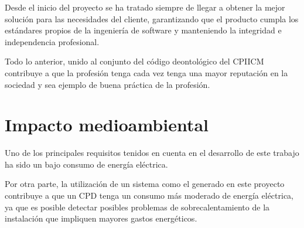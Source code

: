 Desde el inicio del proyecto se ha tratado siempre de llegar a obtener la mejor solución para las necesidades del cliente, garantizando que el producto cumpla los estándares propios de la ingeniería de software y manteniendo la integridad e independencia profesional.

Todo lo anterior, unido al conjunto del código deontológico del CPIICM~\cite{cpiicm_codigo_2012} contribuye a que la profesión tenga cada vez tenga una mayor reputación en la sociedad y sea ejemplo de buena práctica de la profesión.

\section{Impacto medioambiental}\label{sec:impacto-medioambiental}
Uno de los principales requisitos tenidos en cuenta en el desarrollo de este trabajo ha sido un bajo consumo de energía eléctrica.

Por otra parte, la utilización de un sistema como el generado en este proyecto contribuye a que un CPD tenga un consumo más moderado de energía eléctrica, ya que es posible detectar posibles problemas de sobrecalentamiento de la instalación que impliquen mayores gastos energéticos.